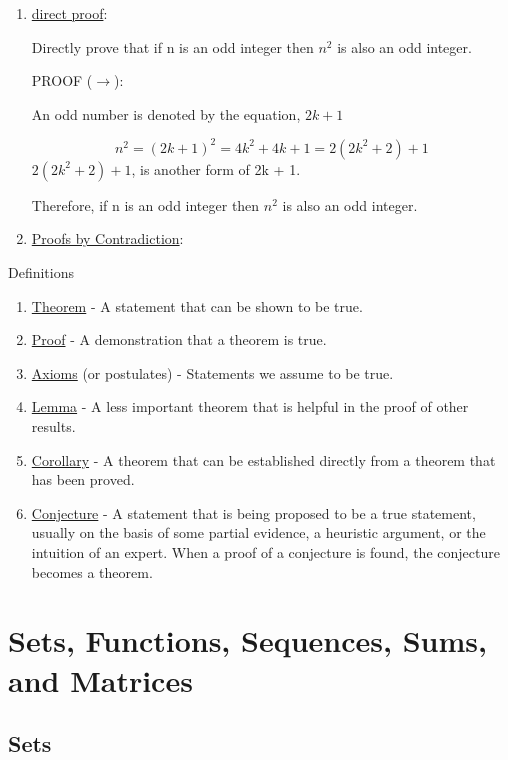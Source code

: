 \documentclass[12pt]{article}
\begin{document}
\begin{enumerate}
\item \underline{direct proof}:

Directly prove that if n is an odd integer then $n^{2}$ is also an odd integer.

PROOF ($\rightarrow$): 

An odd number is denoted by the equation, $2k + 1$

\[
	n^{2} = (2k + 1)^{2} = 4k^{2} + 4k + 1 = 2(2k^{2} + 2) + 1
\]
 $2(2k^{2} + 2) + 1$, is another form of 2k + 1.
 
 Therefore, if n is an odd integer then $n^{2}$ is also an odd integer.
 
 \item \underline{Proofs by Contradiction}:
 
 
\end{enumerate}

\quad

\quad

Definitions
\begin{enumerate}
\item \underline{Theorem} - A statement that can be shown to be true.
\item \underline{Proof} - A demonstration that a theorem is true.
\item \underline{Axioms} (or postulates) - Statements we assume to be true.
\item \underline{Lemma} - A less important theorem that is helpful in the proof of other results.
\item \underline{Corollary} - A theorem that can be established directly from a theorem that has been proved.
\item \underline{Conjecture} - A statement that is being proposed to be a true statement, usually on the basis of some partial evidence, a heuristic argument, or the intuition of an expert. When a proof of a conjecture is found, the conjecture becomes a theorem. 
\end{enumerate}

\pagebreak

\section{Sets, Functions, Sequences, Sums, and Matrices}

\quad

\quad

\subsection{Sets}
\end{document}
